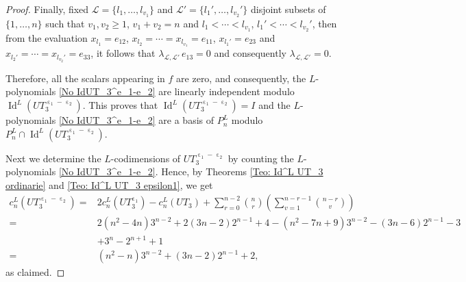 \documentclass[10pt,a4paper]{amsart}
\DeclareMathOperator{\I}{Id}
\DeclareMathOperator{\e}{\varepsilon}
\begin{document}
\begin{proof}
Finally, fixed $\mathcal L=\{l_1,\ldots,l_{v_1}\}$ and $\mathcal L'=\{l_1',\ldots,l_{v_2}'\}$
disjoint subsets of $\{1,\ldots,n\}$ such that $v_1,v_2\ge1$, $v_1+v_2=n$ and $l_1<\cdots<l_{v_1}$,
$l_1'<\cdots<l_{v_2}'$, then from the evaluation $x_{l_1}=e_{12}$,
$x_{l_2}=\cdots=x_{l_{v_1}}=e_{11}$, $x_{l_1'}=e_{23}$ and $x_{l_2'}=\cdots=x_{l_{v_2}'}=e_{33}$,
it follows that $\lambda_{\mathcal L,\mathcal L'}\,e_{13}=0$ and consequently
$\lambda_{\mathcal L,\mathcal L'}=0$.

Therefore, all the scalars appearing in $f$ are zero, and consequently, the $L$-polynomials
\eqref{No IdUT_3^e_1-e_2} are linearly independent modulo $\I^L(UT_3^{\e_1-\e_2})$. This proves that
$\I^L(UT_3^{\e_1-\e_2})=I$ and the $L$-polynomials \eqref{No IdUT_3^e_1-e_2} are a basis of $P_n^L$
modulo $P_n^L\cap\I^L(UT_3^{\e_1-\e_2})$.

  
  Next we determine the $L$-codimensions of $UT_3^{\e_1-\e_2}$ by counting the $L$-polynomials \eqref{No IdUT_3^e_1-e_2}. 
Hence, by Theorems \ref{Teo: Id^L UT_3 ordinarie} and \ref{Teo: Id^L UT_3 epsilon1}, we get
\begin{align*}
     c_n^L(UT_3^{\e_1-\e_2}) =&   2 c_n^L(UT_3^{\e_1})-c_n^L(UT_3)+\sum_{r=0}^{n-2} \binom{n}{r} \left( \sum_{v=1}^{n-r-1}\binom{n-r}{v}\right)\\
      = &2(n^2-4n)3^{n-2}+ 2(3n-2)2^{n-1} +4-(n^2-7n+9) 3^{n-2}-(3n-6)2^{n-1}-3\\
     &+3^n-2^{n+1}+1\\
      = &(n^2 - n)3^{n-2} + (3n - 2)2^{n-1} + 2,
\end{align*}
as claimed.
\end{proof}
\end{document}
